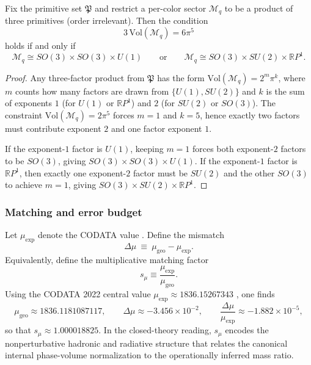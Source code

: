 \begin{proposition}
\label{prop:mu_phase_factorization_rigidity}
Fix the primitive set $\mathfrak{P}$ and restrict a per-color sector $\mathcal{M}_q$ to be a product of three primitives (order irrelevant). Then the condition
\begin{equation}
    3\,\mathrm{Vol}(\mathcal{M}_q)=6\pi^5
\end{equation}
holds if and only if
\begin{equation}
    \mathcal{M}_q\cong SO(3)\times SO(3)\times U(1)
    \qquad\text{or}\qquad
    \mathcal{M}_q\cong SO(3)\times SU(2)\times \mathbb{R}P^1.
\end{equation}
\end{proposition}
\begin{proof}
Any three-factor product from $\mathfrak{P}$ has the form $\mathrm{Vol}(\mathcal{M}_q)=2^{m}\pi^{k}$, where $m$ counts how many factors are drawn from $\{U(1),SU(2)\}$ and $k$ is the sum of exponents $1$ (for $U(1)$ or $\mathbb{R}P^1$) and $2$ (for $SU(2)$ or $SO(3)$). The constraint $\mathrm{Vol}(\mathcal{M}_q)=2\pi^5$ forces $m=1$ and $k=5$, hence exactly two factors must contribute exponent $2$ and one factor exponent $1$.
\par
\noindent
If the exponent-$1$ factor is $U(1)$, keeping $m=1$ forces both exponent-$2$ factors to be $SO(3)$, giving $SO(3)\times SO(3)\times U(1)$. If the exponent-$1$ factor is $\mathbb{R}P^1$, then exactly one exponent-$2$ factor must be $SU(2)$ and the other $SO(3)$ to achieve $m=1$, giving $SO(3)\times SU(2)\times \mathbb{R}P^1$.
\end{proof}

\subsubsection{Matching and error budget}
Let $\mu_{\mathrm{exp}}$ denote the CODATA value \cite{CODATA2022RMP}. Define the mismatch
\begin{equation}
    \Delta\mu\ \equiv\ \mu_{\mathrm{geo}}-\mu_{\mathrm{exp}}.
    \label{eq:mu_mismatch_def}
\end{equation}
Equivalently, define the multiplicative matching factor
\begin{equation}
    s_\mu \equiv \frac{\mu_{\mathrm{exp}}}{\mu_{\mathrm{geo}}}.
\end{equation}
Using the CODATA 2022 central value $\mu_{\mathrm{exp}}\approx 1836.15267343$ \cite{CODATA2022RMP}, one finds
\begin{equation}
    \mu_{\mathrm{geo}}\approx 1836.1181087117,\qquad
    \Delta\mu\approx -3.456\times 10^{-2},\qquad
    \frac{\Delta\mu}{\mu_{\mathrm{exp}}}\approx -1.882\times 10^{-5},
\end{equation}
so that $s_\mu\approx 1.000018825$. In the closed-theory reading, $s_\mu$ encodes the nonperturbative hadronic and radiative structure that relates the canonical internal phase-volume normalization to the operationally inferred mass ratio.

